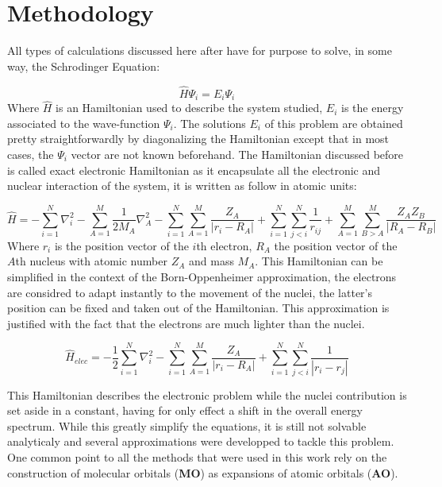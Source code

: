\documentclass[10pt]{report}
\numberwithin{equation}{section}
\begin{document}
\section{Methodology}

All types of calculations discussed here after have for purpose to solve, in some way, the Schrodinger Equation:

\begin{equation}
    \hat{H}\Psi_i=E_i\Psi_i
\end{equation}
Where $\hat{H}$ is an Hamiltonian used to describe the system studied, $E_i$ is the energy associated to the wave-function $\Psi_i$. 
The solutions $E_i$ of this problem are obtained pretty straightforwardly by diagonalizing the Hamiltonian except that in most cases, the $\Psi_i$ vector are not known beforehand.
The Hamiltonian discussed before is called exact electronic Hamiltonian as it encapsulate all the electronic and nuclear interaction of the system, it is written as follow in atomic units:

\begin{equation}
    \hat{H}=-\sum_{i=1}^{N}\nabla_i^2-\sum_{A=1}^{M}\frac{1}{2M_A}\nabla_A^2%
    -\sum_{i=1}^{N}\sum_{A=1}^{M}\frac{Z_A}{|r_i-R_A|}+\sum_{i=1}^{N}\sum_{j<i}^{N}\frac{1}{r_{ij}}%
    +\sum_{A=1}^{M}\sum_{B>A}^{M}\frac{Z_A Z_B}{|R_A-R_B|}
\end{equation}
Where $r_i$ is the position vector of the $i$th electron, $R_A$ the position vector of the $A$th nucleus with atomic number $Z_A$ and mass $M_A$.
This Hamiltonian can be simplified in the context of the Born-Oppenheimer approximation, the electrons are considred to adapt instantly to the movement of the nuclei, the latter's position can be fixed and taken out of the Hamiltonian.
This approximation is justified with the fact that the electrons are much lighter than the nuclei. 

\begin{equation}\label{Helec}
    \hat{H}_{elec}=-\frac{1}{2}\sum_{i=1}^{N}\nabla_i^2%
    -\sum_{i=1}^{N}\sum_{A=1}^{M}\frac{Z_A}{|r_i-R_A|}+\sum_{i=1}^{N}\sum_{j<i}^{N}\frac{1}{|r_i-r_j|}%
\end{equation}

This Hamiltonian describes the electronic problem while the nuclei contribution is set aside in a constant, having for only effect a shift in the overall energy spectrum. 
While this greatly simplify the equations, it is still not solvable analyticaly and several approximations were developped to tackle this problem. %
One common point to all the methods that were used in this work rely on the construction of molecular orbitals (\textbf{MO}) as expansions of atomic orbitals (\textbf{AO}).
\end{document}
